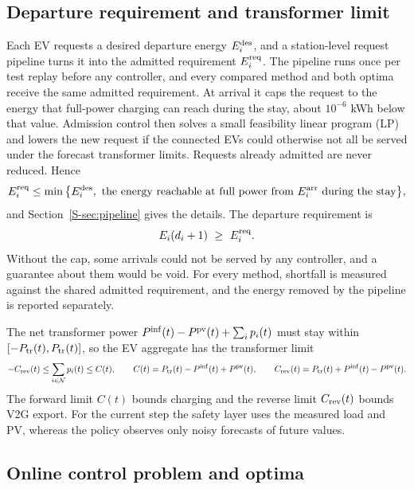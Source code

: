 \subsection{Departure requirement and transformer limit}\label{sec:requirement}

Each EV requests a desired departure energy $E_i^{\mathrm{des}}$, and a station-level request pipeline turns it into the admitted requirement $E^{\mathrm{req}}_i$.
The pipeline runs once per test replay before any controller, and every compared method and both optima receive the same admitted requirement.
At arrival it caps the request to the energy that full-power charging can reach during the stay, about $10^{-6}$ kWh below that value.
Admission control then solves a small feasibility linear program (LP) and lowers the new request if the connected EVs could otherwise not all be served under the forecast transformer limits.
Requests already admitted are never reduced.
Hence
\begin{equation}\label{eq:cap}
E^{\mathrm{req}}_i\le\min\big\{E_i^{\mathrm{des}},\ \text{the energy reachable at full power from }E_i^{\mathrm{arr}}\text{ during the stay}\big\},
\end{equation}
and Section~\ref{S-sec:pipeline} gives the details.
The departure requirement is
\begin{equation}\label{eq:requirement}
E_i(d_i+1)\ \ge\ E^{\mathrm{req}}_i .
\end{equation}
Without the cap, some arrivals could not be served by any controller, and a guarantee about them would be void.
For every method, shortfall is measured against the shared admitted requirement, and the energy removed by the pipeline is reported separately.

The net transformer power $P^{\mathrm{inf}}(t)-P^{\mathrm{pv}}(t)+\sum_{i}p_i(t)$ must stay within $[-P_{\mathrm{tr}}(t),P_{\mathrm{tr}}(t)]$, so the EV aggregate has the transformer limit
\begin{equation}\label{eq:transformer}
-C_{\mathrm{rev}}(t)\le\sum_{i\in\mathcal N}p_i(t)\le C(t),\qquad
C(t)=P_{\mathrm{tr}}(t)-P^{\mathrm{inf}}(t)+P^{\mathrm{pv}}(t),\qquad C_{\mathrm{rev}}(t)=P_{\mathrm{tr}}(t)+P^{\mathrm{inf}}(t)-P^{\mathrm{pv}}(t).
\end{equation}
The forward limit $C(t)$ bounds charging and the reverse limit $C_{\mathrm{rev}}(t)$ bounds V2G export.
For the current step the safety layer uses the measured load and PV, whereas the policy observes only noisy forecasts of future values.

\subsection{Online control problem and optima}\label{sec:online}

